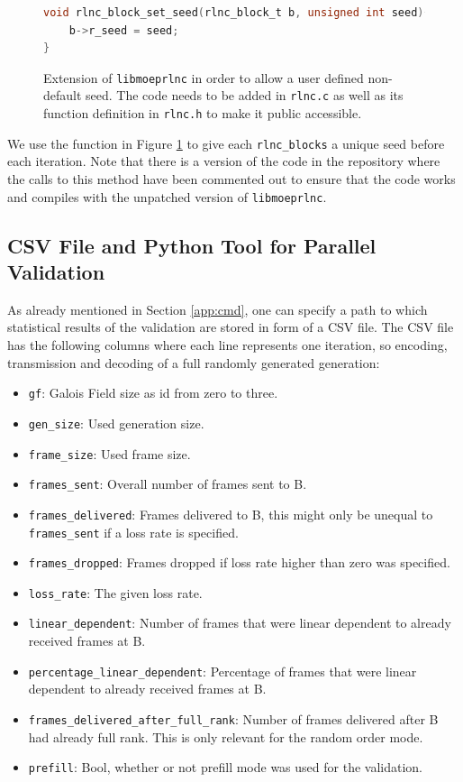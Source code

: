 \documentclass[a4paper,english,10pt]{tumarticle}
\begin{document}
\begin{figure}[h]
  \begin{lstlisting}[language=C]
void rlnc_block_set_seed(rlnc_block_t b, unsigned int seed){
    b->r_seed = seed;
}
\end{lstlisting}
  \caption[]{Extension of \texttt{libmoeprlnc} in order to allow a user defined non-default seed. The code needs to be added in \texttt{rlnc.c} as well as 
  its function definition in \texttt{rlnc.h} to make it public accessible.}
  \label{code}
\end{figure}

We use the function in Figure \ref{code} to give each \texttt{rlnc\_blocks} a unique seed before each iteration.
Note that there is a version of the code in the repository where the calls to this method 
have been commented out to ensure that the code works and compiles with the unpatched version of \texttt{libmoeprlnc}.



\subsection{CSV File and Python Tool for Parallel Validation}

As already mentioned in Section \ref{app:cmd}, one can specify a path to which statistical results of the validation are stored in form of a CSV file.
The CSV file has the following columns where each line represents one iteration, so encoding, transmission and decoding of a full randomly generated generation:
\begin{itemize}
  \item \texttt{gf}: Galois Field size as id from zero to three.
  \item \texttt{gen\_size}: Used generation size.
  \item \texttt{frame\_size}: Used frame size.
  \item \texttt{frames\_sent}: Overall number of frames sent to B.
  \item \texttt{frames\_delivered}: Frames delivered to B, this might only be unequal to \texttt{frames\_sent} if a loss rate is specified.
  \item \texttt{frames\_dropped}: Frames dropped if loss rate higher than zero was specified.
  \item \texttt{loss\_rate}: The given loss rate.
  \item \texttt{linear\_dependent}: Number of frames that were linear dependent to already received frames at B.
  \item \texttt{percentage\_linear\_dependent}: Percentage of frames that were linear dependent to already received frames at B.
  \item \texttt{frames\_delivered\_after\_full\_rank}: Number of frames delivered after B had already full rank. This is only relevant for the random order mode.
  \item \texttt{prefill}: Bool, whether or not prefill mode was used for the validation.
\end{itemize}
\end{document}
